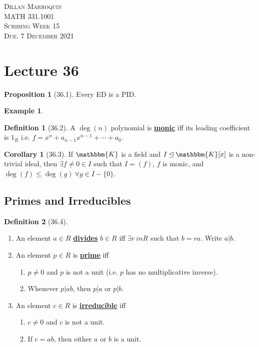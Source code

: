 \documentclass{article}
\newcommand{\define}[1]{\textbf{\underline{#1}}}
\theoremstyle{definition}
\newtheorem*{defn}{Definition}
\newtheorem*{cor}{Corollary}
\newtheorem*{prop}{Proposition}
\newtheorem*{ex}{Example}
\theoremstyle{remark}
\newcommand{\ideal}{\unlhd}
\newcommand{\K}{\mathbbm{K}}
\begin{document}
    \begin{center}
        \textsc{Dillan Marroquin\\MATH 331.1001\\Scribing Week 15\\Due. 7 December 2021\\}
    \end{center}
        
    \section*{Lecture 36}{
        \begin{prop}[36.1]
            Every ED is a PID.
        \end{prop}
        
        \begin{ex}
            \begin{defn}[36.2]
                A $\deg(n)$ polynomial is \define{monic} iff its leading coefficient is $1_R$ i.e. $f=x^n+a_{n-1}x^{n-1}+\cdots+a_0$.
            \end{defn}
            \begin{cor}[36.3]
                If $\K$ is a field and $I \ideal \K[x]$ is a non-trivial ideal, then $\exists f\neq 0 \in I$ such that $I=(f)$, $f$ is monic, and $\deg(f) \leq \deg(g) \ \forall g\in I-\{0\}$.
            \end{cor}
        \end{ex}
        
        \subsection*{Primes and Irreducibles}{
            \begin{defn}[36.4]
                \begin{enumerate}
                    \item An element $a \in R$ \define{divides} $b\in R$ iff $\exists r\ in R$ such that $b=ra$. Write $a|b$.
                    \item An element $p \in R$ is \define{prime} iff
                    \begin{enumerate}
                        \item $p\neq 0$ and $p$ is not a unit (i.e. $p$ has no multiplicative inverse).
                        \item Whenever $p|ab$, then $p|a$ or $p|b$.
                    \end{enumerate}
                    \item An element $c \in R$ is \define{irreducible} iff
                    \begin{enumerate}
                        \item $c\neq 0$ and $c$ is not a unit.
                        \item If $c=ab$, then either $a$ or $b$ is a unit.
                    \end{enumerate}
                \end{enumerate}
            \end{defn}
            
}}
\end{document}
